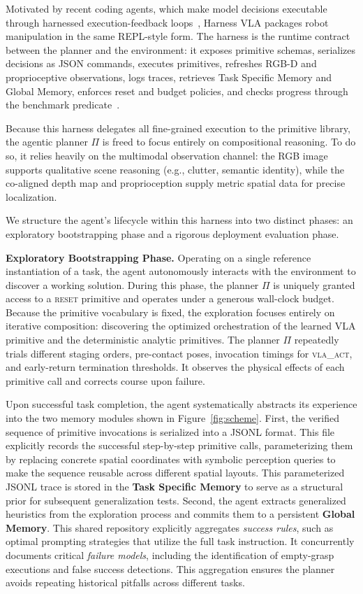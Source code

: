 \documentclass[11pt]{article}
\begin{document}
Motivated by recent coding agents, which make model decisions executable through harnessed execution-feedback loops~\citep{wang2024codeact, yang2024sweagent, wang2025openhands}, Harness VLA packages robot manipulation in the same REPL-style form. The harness is the runtime contract between the planner and the environment: it exposes primitive schemas, serializes decisions as JSON commands, executes primitives, refreshes RGB-D and proprioceptive observations, logs traces, retrieves Task Specific Memory and Global Memory, enforces reset and budget policies, and checks progress through the benchmark predicate~\citep{ning2026code}.

Because this harness delegates all fine-grained execution to the primitive library, the agentic planner $\Pi$ is freed to focus entirely on compositional reasoning. To do so, it relies heavily on the multimodal observation channel: the RGB image supports qualitative scene reasoning (e.g., clutter, semantic identity), while the co-aligned depth map and proprioception supply metric spatial data for precise localization.

We structure the agent's lifecycle within this harness into two distinct phases: an exploratory bootstrapping phase and a rigorous deployment evaluation phase.

\textbf{Exploratory Bootstrapping Phase.} Operating on a single reference instantiation of a task, the agent autonomously interacts with the environment to discover a working solution. During this phase, the planner $\Pi$ is uniquely granted access to a \textsc{reset} primitive and operates under a generous wall-clock budget. Because the primitive vocabulary is fixed, the exploration focuses entirely on iterative composition: discovering the optimized orchestration of the learned VLA primitive and the deterministic analytic primitives. The planner $\Pi$ repeatedly trials different staging orders, pre-contact poses, invocation timings for \textsc{vla\_act}, and early-return termination thresholds. It observes the physical effects of each primitive call and corrects course upon failure.

Upon successful task completion, the agent systematically abstracts its experience into the two memory modules shown in Figure~\ref{fig:scheme}. First, the verified sequence of primitive invocations is serialized into a JSONL format. This file explicitly records the successful step-by-step primitive calls, parameterizing them by replacing concrete spatial coordinates with symbolic perception queries to make the sequence reusable across different spatial layouts. This parameterized JSONL trace is stored in the \textbf{Task Specific Memory} to serve as a structural prior for subsequent generalization tests. Second, the agent extracts generalized heuristics from the exploration process and commits them to a persistent \textbf{Global Memory}. This shared repository explicitly aggregates \emph{success rules}, such as optimal prompting strategies that utilize the full task instruction. It concurrently documents critical \emph{failure models}, including the identification of empty-grasp executions and false success detections. This aggregation ensures the planner avoids repeating historical pitfalls across different tasks.
\end{document}
